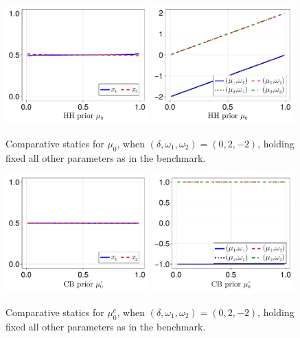 \documentclass[12pt,a4paper]{article}
\begin{document}
\begin{figure}[H]
\centering
\includegraphics[width=0.49\textwidth]{figures/V8/γ_1/fig_optimal_π_across_μ_0_ω_1_2_ω_2_-2_δ_0.0_.pdf}
\includegraphics[width=0.49\textwidth]{figures/V8/γ_1/fig_posterior_across_μ_0_ω_1_2_ω_2_-2_δ_0.0_.pdf}
\caption{Comparative statics for $\mu_0$, when $(\delta,\omega_1,\omega_2)=(0,2,-2)$, holding fixed all other parameters as in the benchmark.}
\label{FigureA25}
\end{figure}

\begin{figure}[H]
\centering
\includegraphics[width=0.49\textwidth]{figures/V8/γ_1/fig_optimal_π_across_μ_0_c_ω_1_2_ω_2_-2_δ_0.0_.pdf}
\includegraphics[width=0.49\textwidth]{figures/V8/γ_1/fig_posterior_across_μ_0_c_ω_1_2_ω_2_-2_δ_0.0_.pdf}
\caption{Comparative statics for $\mu_0^c$, when $(\delta,\omega_1,\omega_2)=(0,2,-2)$, holding fixed all other parameters as in the benchmark.}
\label{FigureA26}
\end{figure}
\end{document}
